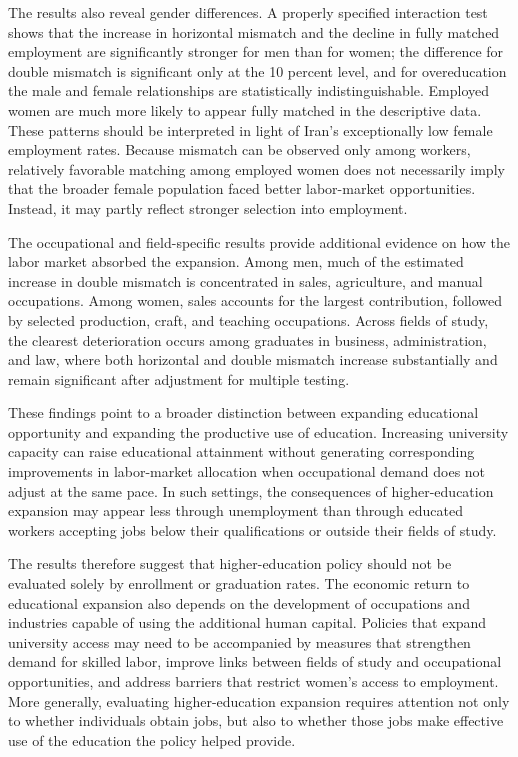 The results also reveal gender differences. A properly specified interaction test shows that the increase in horizontal mismatch and the decline in fully matched employment are significantly stronger for men than for women; the difference for double mismatch is significant only at the 10 percent level, and for overeducation the male and female relationships are statistically indistinguishable. Employed women are much more likely to appear fully matched in the descriptive data. These patterns should be interpreted in light of Iran's exceptionally low female employment rates. Because mismatch can be observed only among workers, relatively favorable matching among employed women does not necessarily imply that the broader female population faced better labor-market opportunities. Instead, it may partly reflect stronger selection into employment.

The occupational and field-specific results provide additional evidence on how the labor market absorbed the expansion. Among men, much of the estimated increase in double mismatch is concentrated in sales, agriculture, and manual occupations. Among women, sales accounts for the largest contribution, followed by selected production, craft, and teaching occupations. Across fields of study, the clearest deterioration occurs among graduates in business, administration, and law, where both horizontal and double mismatch increase substantially and remain significant after adjustment for multiple testing.

These findings point to a broader distinction between expanding educational opportunity and expanding the productive use of education. Increasing university capacity can raise educational attainment without generating corresponding improvements in labor-market allocation when occupational demand does not adjust at the same pace. In such settings, the consequences of higher-education expansion may appear less through unemployment than through educated workers accepting jobs below their qualifications or outside their fields of study.

The results therefore suggest that higher-education policy should not be evaluated solely by enrollment or graduation rates. The economic return to educational expansion also depends on the development of occupations and industries capable of using the additional human capital. Policies that expand university access may need to be accompanied by measures that strengthen demand for skilled labor, improve links between fields of study and occupational opportunities, and address barriers that restrict women's access to employment. More generally, evaluating higher-education expansion requires attention not only to whether individuals obtain jobs, but also to whether those jobs make effective use of the education the policy helped provide.
